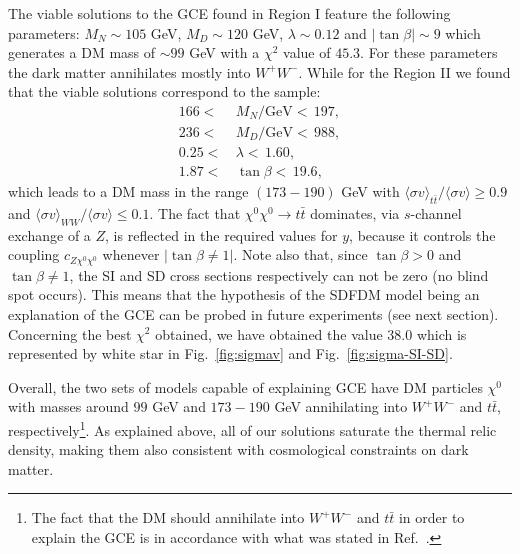 The viable solutions to the GCE found in Region I feature the following parameters: $M_N\sim 105$ GeV, $M_D\sim 120$ GeV, $\lambda\sim 0.12$ and $|\tan\beta|\sim 9$ which generates a DM mass of $\sim 99$ GeV with a $\chi^2$ value of $45.3$. For these parameters the dark matter annihilates mostly into $W^+W^-$. 
While for the Region II we found that the viable solutions correspond to the sample:
\begin{align}
166  < & \, M_N/\text{GeV} < \, 197 , \nonumber \\
236  < & \, M_D/\text{GeV} < \, 988 , \nonumber \\ 
0.25  < & \, \lambda < \, 1.60 ,\nonumber \\
1.87 <  &\, \tan\beta < \, 19.6,
\end{align}
which leads to a DM mass in the range $(173-190)$ GeV with $\langle\sigma v\rangle_{t\bar{t}}/\langle\sigma v\rangle\geq 0.9$ and $\langle\sigma v\rangle_{WW}/\langle\sigma v\rangle\leq 0.1$. The fact that $\chi^0\chi^0\to t\bar{t}$ dominates, via $s$-channel exchange of a $Z$, is reflected in the required values for $y$, because it controls the coupling $c_{Z\chi^0\chi^0}$ whenever $|\tan\beta\neq1|$. 
Note also that, since $\tan\beta>0$ and $\tan\beta\neq1$, the SI and SD cross sections respectively can not be zero (no blind spot occurs). This means that the hypothesis of the SDFDM model being an explanation of the GCE can be probed in future experiments (see next section). Concerning the best $\chi^2$ obtained, we have obtained the value $38.0$ which is represented by white star in Fig.~\ref{fig:sigmav} and Fig.~\ref{fig:sigma-SI-SD}. 

Overall, the two sets of models capable of explaining GCE have DM particles $\chi^0$ with masses around $99$ GeV and $173-190$ GeV annihilating into $W^+W^-$ and $t\bar{t}$, respectively\footnote{The fact that the DM should annihilate into $W^+W^-$ and $t\bar{t}$ in order to explain the GCE is in accordance with what was stated in Ref.~\cite{Agrawal:2014oha}.}. As explained above, all of our solutions saturate the thermal relic density, making them also consistent with cosmological constraints on dark matter. 

